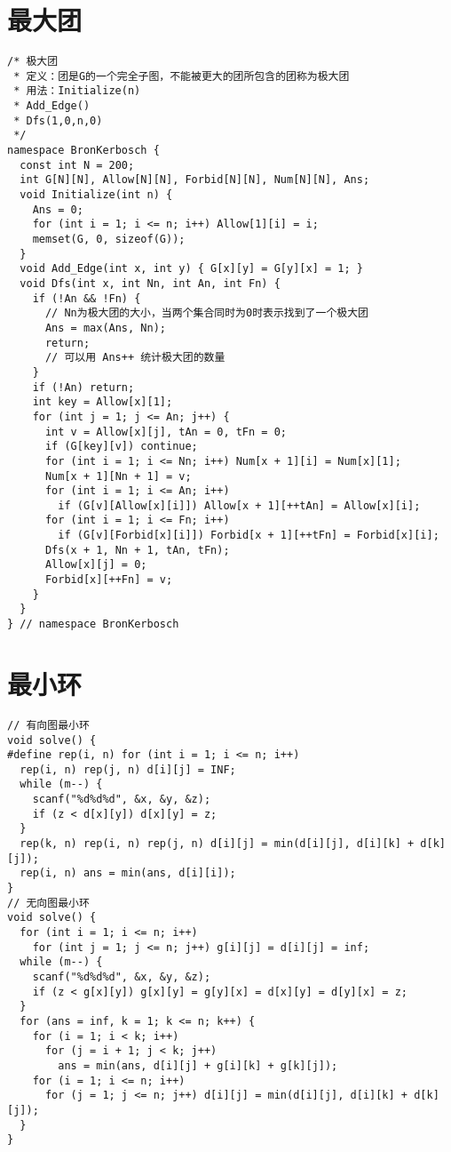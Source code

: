 \section{最大团}

\begin{lstlisting}
/* 极大团
 * 定义：团是G的一个完全子图，不能被更大的团所包含的团称为极大团
 * 用法：Initialize(n)
 * Add_Edge()
 * Dfs(1,0,n,0)
 */
namespace BronKerbosch {
  const int N = 200;
  int G[N][N], Allow[N][N], Forbid[N][N], Num[N][N], Ans;
  void Initialize(int n) {
    Ans = 0;
    for (int i = 1; i <= n; i++) Allow[1][i] = i;
    memset(G, 0, sizeof(G));
  }
  void Add_Edge(int x, int y) { G[x][y] = G[y][x] = 1; }
  void Dfs(int x, int Nn, int An, int Fn) {
    if (!An && !Fn) {
      // Nn为极大团的大小，当两个集合同时为0时表示找到了一个极大团
      Ans = max(Ans, Nn);
      return;
      // 可以用 Ans++ 统计极大团的数量
    }
    if (!An) return;
    int key = Allow[x][1];
    for (int j = 1; j <= An; j++) {
      int v = Allow[x][j], tAn = 0, tFn = 0;
      if (G[key][v]) continue;
      for (int i = 1; i <= Nn; i++) Num[x + 1][i] = Num[x][1];
      Num[x + 1][Nn + 1] = v;
      for (int i = 1; i <= An; i++)
        if (G[v][Allow[x][i]]) Allow[x + 1][++tAn] = Allow[x][i];
      for (int i = 1; i <= Fn; i++)
        if (G[v][Forbid[x][i]]) Forbid[x + 1][++tFn] = Forbid[x][i];
      Dfs(x + 1, Nn + 1, tAn, tFn);
      Allow[x][j] = 0;
      Forbid[x][++Fn] = v;
    }
  }
} // namespace BronKerbosch

\end{lstlisting}


\section{最小环}

\begin{lstlisting}
// 有向图最小环
void solve() {
#define rep(i, n) for (int i = 1; i <= n; i++)
  rep(i, n) rep(j, n) d[i][j] = INF;
  while (m--) {
    scanf("%d%d%d", &x, &y, &z);
    if (z < d[x][y]) d[x][y] = z;
  }
  rep(k, n) rep(i, n) rep(j, n) d[i][j] = min(d[i][j], d[i][k] + d[k][j]);
  rep(i, n) ans = min(ans, d[i][i]);
}
// 无向图最小环
void solve() {
  for (int i = 1; i <= n; i++)
    for (int j = 1; j <= n; j++) g[i][j] = d[i][j] = inf;
  while (m--) {
    scanf("%d%d%d", &x, &y, &z);
    if (z < g[x][y]) g[x][y] = g[y][x] = d[x][y] = d[y][x] = z;
  }
  for (ans = inf, k = 1; k <= n; k++) {
    for (i = 1; i < k; i++)
      for (j = i + 1; j < k; j++)
        ans = min(ans, d[i][j] + g[i][k] + g[k][j]);
    for (i = 1; i <= n; i++)
      for (j = 1; j <= n; j++) d[i][j] = min(d[i][j], d[i][k] + d[k][j]);
  }
}

\end{lstlisting}

